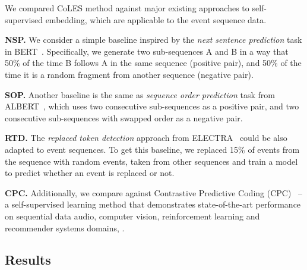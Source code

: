\documentclass[sigconf, anonymous]{acmart}
\begin{document}
We compared CoLES method against major existing approaches to self-supervised embedding, which are
applicable to the event sequence data.

\textbf{NSP.} We consider a simple baseline inspired by the \emph{next sentence prediction} task
in BERT~\citep{Devlin2019BERTPO}. Specifically, we generate two sub-sequences A and B in a way
that 50\% of the time B follows A in the same sequence (positive pair), and 50\% of the time it
is a random fragment from another sequence (negative pair).

\textbf{SOP.} Another baseline is the same as \emph{sequence order prediction} task from
ALBERT~\citep{Lan2020ALBERTAL}, which uses two consecutive sub-sequences as a positive pair,
and two consecutive sub-sequences with swapped order as a negative pair.

\textbf{RTD.} The \emph{replaced token detection} approach from ELECTRA~\citep{Clark2020ELECTRAPT}
could be also adapted to event sequences. To get this baseline, we replaced 15\% of events from
the sequence with random events, taken from other sequences and train a model to predict whether
an event is replaced or not.

\textbf{CPC.} Additionally, we compare against Contrastive Predictive Coding
(CPC)~\citep{Oord2018RepresentationLW} -- a self-supervised learning method that demonstrates state-of-the-art
performance on sequential data audio, computer vision, reinforcement learning and recommender systems domains,
\citep{Zhou2020ContrastiveLF}.

\subsection{Results} \label{sec-res}
\end{document}
